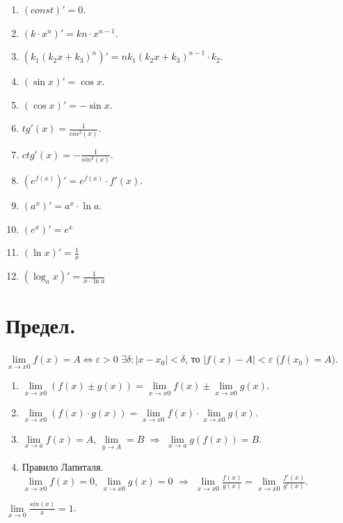 \documentclass[12pt]{article}
\begin{document}
	\begin{property}
		\begin{enumerate}
			\item $(const)' = 0$.
			\item $(k \cdot x^n)' = kn \cdot x^{n - 1}$.
			\item $(k_1(k_2x + k_3)^n)' = nk_1(k_2x + k_3)^{n - 1} \cdot k_2$.
			\item $(\sin x)' = \cos x$.
			\item $(\cos x)' = - \sin x$.
			\item $tg'(x) = \frac{1}{cos^2(x)}$.
			\item $ctg'(x) = - \frac{1}{sin^2(x)}$.
			\item $(e^{f(x)})' = e^{f(x)} \cdot f'(x)$.
			\item $(a^x)' = a^x \cdot \ln a$.
			\item $(e^x)' = e^x$
			\item $(\ln x)' = \frac{1}{x}$
			\item $(\log_a x)' = \frac{1}{x \cdot \ln a}$
		\end{enumerate}
	\end{property}
	\section{Предел.}
	\begin{definition}[По Коши]
		$\lim \limits_{x \rightarrow x0} f(x) = A \Leftrightarrow \varepsilon > 0$ $\exists \delta: |x - x_0| < \delta$, то $|f(x) - A| < \varepsilon$ ($f(x_0) = A$).
	\end{definition}
	\begin{property}
		\begin{enumerate}
			\item $\lim \limits_{x \rightarrow x0} (f(x) \pm g(x)) = \lim \limits_{x \rightarrow x0} f(x) \pm \lim \limits_{x \rightarrow x0} g(x)$.
			\item $\lim \limits_{x \rightarrow x0} (f(x) \cdot g(x)) = \lim \limits_{x \rightarrow x0} f(x) \cdot \lim \limits_{x \rightarrow x0} g(x)$.
			\item $\lim \limits_{x \rightarrow a} f(x) = A$, $\lim \limits_{y \rightarrow A} = B$ $\Rightarrow$ $\lim \limits_{x \rightarrow a} g(f(x)) = B$.
			\item Правило Лапиталя.\\
			$\lim \limits_{x \rightarrow x0} f(x) = 0$, $\lim \limits_{x \rightarrow x0} g(x) = 0$ $\Rightarrow$ $\lim \limits_{x \rightarrow x0} \frac{f(x)}{g(x)} = \lim \limits_{x \rightarrow x0} \frac{f'(x)}{g'(x)}$.
		\end{enumerate}
	\end{property}
	\begin{statement}
		$\lim \limits_{x \rightarrow 0} \frac{sin(x)}{x} = 1$.
	\end{statement}
\end{document}
